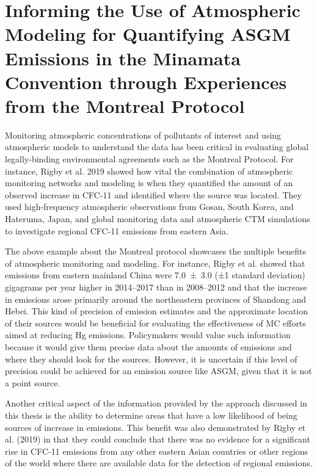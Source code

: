 \section{Informing the Use of Atmospheric Modeling for Quantifying ASGM Emissions in the Minamata Convention through Experiences from the Montreal Protocol} \label{motreal_protocol_comparison}

\begin{flushleft}
Monitoring atmospheric concentrations of pollutants of interest and using atmospheric models to understand the data has been critical in evaluating global legally-binding environmental agreements such as the Montreal Protocol. For instance, Rigby et al. 2019 showed how vital the combination of atmospheric monitoring networks and modeling is when they quantified the amount of an observed increase in CFC-11 and identified where the source was located\cite{rigby_increase_2019}. They used high-frequency atmospheric observations from Gosan, South Korea, and Hateruma, Japan, and global monitoring data and atmospheric CTM simulations to investigate regional CFC-11 emissions from eastern Asia.  
\end{flushleft}
\begin{flushleft}
    The above example about the Montreal protocol showcases the multiple benefits of atmospheric monitoring and modeling. For instance, Rigby et al.\cite{rigby_increase_2019}  showed that emissions from eastern mainland China were 7.0 ± 3.0 (±1 standard deviation) gigagrams per year higher in 2014–2017 than in 2008–2012 and that the increase in emissions arose primarily around the northeastern provinces of Shandong and Hebei\cite{rigby_increase_2019}. This kind of precision of emission estimates and the approximate location of their sources would be beneficial for evaluating the effectiveness of MC efforts aimed at reducing Hg emissions. Policymakers would value such information because it would give them precise data about the amounts of emissions and where they should look for the sources. However, it is uncertain if this level of precision could be achieved for an emission source like ASGM, given that it is not a point source.
    
    Another critical aspect of the information provided by the approach discussed in this thesis is the ability to determine areas that have a low likelihood of being sources of increase in emissions. This benefit was also demonstrated  by Rigby et al. (2019)  in that they could conclude that there was no evidence for a significant rise in CFC-11 emissions from any other eastern Asian countries or other regions of the world where there are available data for the detection of regional emissions.
\end{flushleft}

